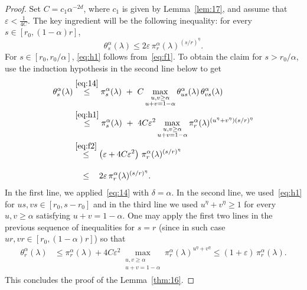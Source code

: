 \documentclass[10pt]{amsart}
\theoremstyle{definition}\newtheorem{defi}[theo]{Definition}\newtheorem{rema}[theo]{Remark}\newtheorem{exam}[theo]{Example}\newtheorem{exem}[theo]{Example}\newtheorem{nota}[theo]{Notation}
\newcommand{\ep}{\varepsilon}
\begin{document}
\begin{proof}
Set $C=c_1\alpha^{-2d}$, where $c_1$ is given by Lemma~\ref{lem:17}, and assume that $\ep<\tfrac1{4C}$. The key ingredient will be the following inequality: for every $s\in[r_0,(1-\alpha)r]$,
\begin{equation}\label{eq:h1}
\theta_s^\alpha(\lambda)\le 2\ep\, \pi_r^\alpha(\lambda)^{(s/r)^\eta}.
\end{equation}
For $s\in[r_0,r_0/\alpha]$, \eqref{eq:h1} follows from~\eqref{eq:f1}. To obtain the claim for $s> r_0/\alpha$, use the induction hypothesis in the second line below to get
\begin{align*}
\theta^\alpha_s(\lambda)&\stackrel{{\eqref{eq:14}}}\le \pi_s^\alpha(\lambda)~+~C \max_{\substack{u,v\ge \alpha \\ u+v=1-\alpha}}\theta^\alpha_{us}(\lambda)\,\theta^\alpha_{vs}(\lambda)\\
&\stackrel{\eqref{eq:h1}}\le \pi_s^\alpha(\lambda)~+~4C\ep^2 \max_{\substack{u,v\ge\alpha \\ u+v=1-\alpha}}\pi^\alpha_r(\lambda)^{(u^\eta+v^\eta)(s/r)^\eta}\\
&\stackrel{\eqref{eq:f2}}\le \left(\ep+4C\ep^2\right)\, \pi_r^\alpha(\lambda)^{(s/r)^\eta}\\
&\stackrel{\phantom{\eqref{eq:f2}}}\le 2\ep\,\pi_r^\alpha(\lambda)^{(s/r)^\eta}.
\end{align*}
In the first line, we applied~\eqref{eq:14} with $\delta=\alpha$. In the second line, we used~\eqref{eq:h1} for $us,vs\in[r_0,s-r_0]$ and in the third line we used $u^\eta+v^\eta\ge 1$ for every $u,v\ge\alpha$ satisfying $u+v=1-\alpha$. One may apply the first two lines in the previous sequence of inequalities for $s=r$ (since in such case $ur,vr\in[r_0,(1-\alpha)r]$) so that
\begin{align*}
\theta^\alpha_r(\lambda)&
\le \pi_r^\alpha(\lambda)+4C\ep^2 \max_{\substack{u,v\ge\alpha \\ u+v=1-\alpha}}\pi^\alpha_r(\lambda)^{u^\eta+v^\eta}\le (1+\ep)\, \pi_r^\alpha(\lambda).
\end{align*}
This concludes the proof of the Lemma~\ref{thm:16}.
\end{proof}
\end{document}
